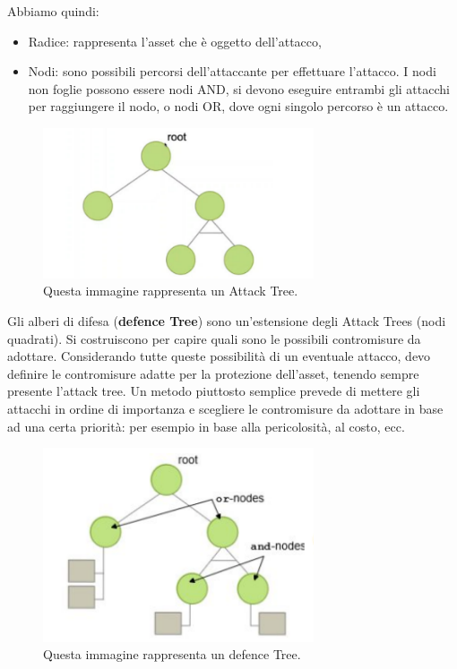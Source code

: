 Abbiamo quindi:

\begin{itemize}
    \item Radice: rappresenta l'asset che è oggetto dell'attacco,
    \item Nodi: sono possibili percorsi dell'attaccante per effettuare l'attacco.
          I nodi non foglie possono essere nodi AND, si devono eseguire entrambi
          gli attacchi per raggiungere il nodo, o nodi OR, dove ogni singolo
          percorso è un attacco.
\end{itemize}

\begin{figure}[H]
    \centering
    \includegraphics[width=8cm, keepaspectratio]{capitoli/risks/imgs/atree.png}
    \caption{Questa immagine rappresenta un Attack Tree.}
\end{figure}

Gli alberi di difesa (\textbf{defence Tree}) sono un'estensione degli
Attack Trees (nodi quadrati). Si costruiscono per capire
quali sono le possibili contromisure da adottare.
Considerando tutte queste possibilità di un eventuale attacco,
devo definire le contromisure adatte per la protezione
dell'asset, tenendo sempre presente l'attack tree.
Un metodo piuttosto semplice prevede di mettere gli attacchi
in ordine di importanza e scegliere le contromisure da
adottare in base ad una certa priorità: per esempio in base
alla pericolosità, al costo, ecc.

\begin{figure}[H]
    \centering
    \includegraphics[width=8cm, keepaspectratio]{capitoli/risks/imgs/dtree.png}
    \caption{Questa immagine rappresenta un defence Tree.}
\end{figure}

